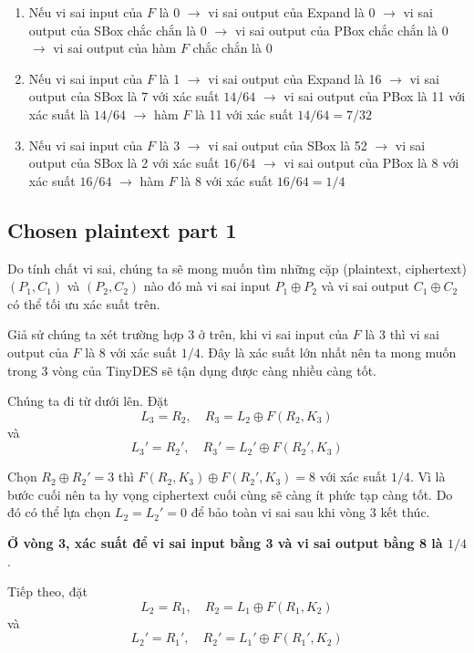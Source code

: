 \documentclass{article}
\begin{document}
\begin{enumerate}
    \item Nếu vi sai input của $F$ là 0 $\rightarrow$ vi sai output của Expand là 0
    $\rightarrow$ vi sai output của SBox chắc chắn là 0 $\rightarrow$ vi sai output
    của PBox chắc chắn là 0 $\rightarrow$ vi sai output của hàm $F$ chắc chắn là 0
    \item Nếu vi sai input của $F$ là 1 $\rightarrow$ vi sai output của Expand là 16
    $\rightarrow$ vi sai output của SBox là 7 với xác suất $14/64$ $\rightarrow$ vi
    sai output của PBox là 11 với xác suất là $14/64$ $\rightarrow$ hàm $F$ là 11 
    với xác suất $14/64=7/32$
    \item Nếu vi sai input của $F$ là 3 $\rightarrow$ vi sai output của SBox là 52
    $\rightarrow$ vi sai output của SBox là 2 với xác suất $16/64$ $\rightarrow$ vi
    sai output của PBox là 8 với xác suất $16/64$ $\rightarrow$ hàm $F$ là 8
    với xác suất $16/64 = 1/4$
\end{enumerate}

\subsection{Chosen plaintext part 1}

Do tính chất vi sai, chúng ta sẽ mong muốn tìm những cặp (plaintext, ciphertext) $(P_1, C_1)$
và $(P_2, C_2)$ nào đó mà vi sai input $P_1 \oplus P_2$ và vi sai output $C_1 \oplus C_2$
có thể tối ưu xác suất trên.

Giả sử chúng ta xét trường hợp 3 ở trên, khi vi sai input của $F$ là 3 thì vi sai output
của $F$ là 8 với xác suất $1/4$. Đây là xác suất lớn nhất nên ta mong muốn trong 3 vòng
của TinyDES sẽ tận dụng được càng nhiều càng tốt.

Chúng ta đi từ dưới lên. Đặt
\[L_3 = R_2, \quad R_3 = L_2 \oplus F(R_2, K_3)\]
và
\[L_3' = R_2', \quad R_3' = L_2' \oplus F(R_2', K_3)\]

Chọn $R_2 \oplus R_2' = 3$ thì $F(R_2, K_3) \oplus F(R_2', K_3) = 8$ với
xác suất $1/4$. Vì là bước cuối nên ta hy vọng ciphertext cuối cùng sẽ càng ít phức
tạp càng tốt. Do đó có thể lựa chọn $L_2 = L_2' = 0$ để bảo toàn vi sai sau khi vòng 
3 kết thúc.

\textbf{Ở vòng 3, xác suất để vi sai input bằng 3 và vi sai output bằng 8 là $1/4$}.

Tiếp theo, đặt
\[L_2 = R_1, \quad R_2 = L_1 \oplus F(R_1, K_2)\]
và
\[L_2' = R_1', \quad R_2' = L_1' \oplus F(R_1', K_2)\]
\end{document}
